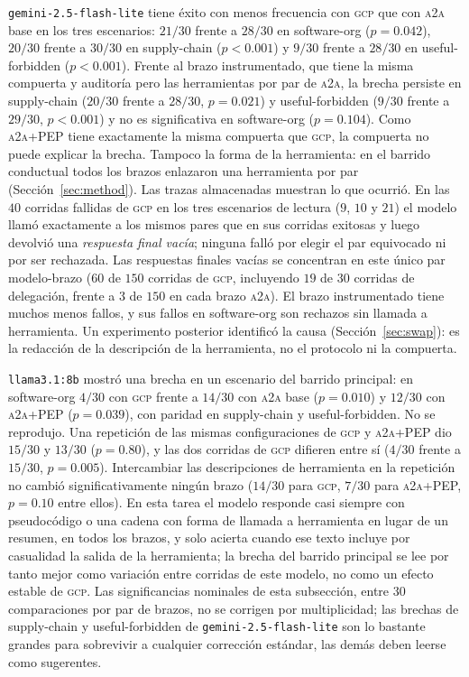 \documentclass[conference,letterpaper]{IEEEtran}
\newcommand{\gcp}{\textsc{gcp}}
\newcommand{\ata}{\textsc{a2a}}
\begin{document}
\texttt{gemini-2.5-flash-lite} tiene éxito con menos frecuencia con \gcp{} que con \ata{} base en los
tres escenarios: $21/30$ frente a $28/30$ en software-org ($p=0.042$), $20/30$ frente a $30/30$ en
supply-chain ($p<0.001$) y $9/30$ frente a $28/30$ en useful-forbidden ($p<0.001$). Frente al brazo
instrumentado, que tiene la misma compuerta y auditoría pero las herramientas por par de \ata{}, la
brecha persiste en supply-chain ($20/30$ frente a $28/30$, $p=0.021$) y useful-forbidden ($9/30$ frente
a $29/30$, $p<0.001$) y no es significativa en software-org ($p=0.104$). Como \ata{}+PEP tiene
exactamente la misma compuerta que \gcp{}, la compuerta no puede explicar la brecha. Tampoco la forma de
la herramienta: en el barrido conductual todos los brazos enlazaron una herramienta por par
(Sección~\ref{sec:method}). Las trazas almacenadas muestran lo que ocurrió. En las $40$ corridas fallidas
de \gcp{} en los tres escenarios de lectura ($9$, $10$ y $21$) el modelo llamó exactamente a los mismos
pares que en sus corridas exitosas y luego devolvió una \emph{respuesta final vacía}; ninguna falló por
elegir el par equivocado ni por ser rechazada. Las respuestas finales vacías se concentran en este único
par modelo-brazo ($60$ de $150$ corridas de \gcp{}, incluyendo $19$ de $30$ corridas de delegación,
frente a $3$ de $150$ en cada brazo \ata{}). El brazo instrumentado tiene muchos menos fallos, y sus
fallos en software-org son rechazos sin llamada a herramienta. Un experimento posterior identificó la
causa (Sección~\ref{sec:swap}): es la redacción de la descripción de la herramienta, no el protocolo ni
la compuerta.

\texttt{llama3.1:8b} mostró una brecha en un escenario del barrido principal: en software-org
$4/30$ con \gcp{} frente a $14/30$ con \ata{} base ($p=0.010$) y $12/30$ con \ata{}+PEP ($p=0.039$), con
paridad en supply-chain y useful-forbidden. No se reprodujo. Una repetición de las mismas
configuraciones de \gcp{} y \ata{}+PEP dio $15/30$ y $13/30$ ($p=0.80$), y las dos corridas de \gcp{}
difieren entre sí ($4/30$ frente a $15/30$, $p=0.005$). Intercambiar las descripciones de herramienta en
la repetición no cambió significativamente ningún brazo ($14/30$ para \gcp{}, $7/30$ para \ata{}+PEP,
$p=0.10$ entre ellos). En esta tarea el modelo responde casi siempre con pseudocódigo o una cadena con
forma de llamada a herramienta en lugar de un resumen, en todos los brazos, y solo acierta cuando ese
texto incluye por casualidad la salida de la herramienta; la brecha del barrido principal se lee por
tanto mejor como variación entre corridas de este modelo, no como un efecto estable de \gcp{}. Las
significancias nominales de esta subsección, entre $30$ comparaciones por par de brazos, no se corrigen por
multiplicidad; las brechas de supply-chain y useful-forbidden de \texttt{gemini-2.5-flash-lite} son lo
bastante grandes para sobrevivir a cualquier corrección estándar, las demás deben leerse como
sugerentes.
\end{document}
